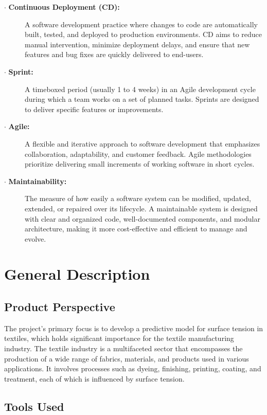 \documentclass{report}
\begin{document}
\begin{description}
    \item[$\cdot$ \textbf{Continuous Deployment (CD):}] A software development practice where changes to code are automatically built, tested, and deployed to production environments. CD aims to reduce manual intervention, minimize deployment delays, and ensure that new features and bug fixes are quickly delivered to end-users.

    \item[$\cdot$ \textbf{Sprint:}] A timeboxed period (usually 1 to 4 weeks) in an Agile development cycle during which a team works on a set of planned tasks. Sprints are designed to deliver specific features or improvements.

    \item[$\cdot$ \textbf{Agile:}] A flexible and iterative approach to software development that emphasizes collaboration, adaptability, and customer feedback. Agile methodologies prioritize delivering small increments of working software in short cycles.

    \item[$\cdot$ \textbf{Maintainability:}] The measure of how easily a software system can be modified, updated, extended, or repaired over its lifecycle. A maintainable system is designed with clear and organized code, well-documented components, and modular architecture, making it more cost-effective and efficient to manage and evolve.

\end{description}



\chapter{General Description}
\section{Product Perspective}
The project's primary focus is to develop a predictive model for surface tension in textiles, which holds significant importance for the textile manufacturing industry. The textile industry is a multifaceted sector that encompasses the production of a wide range of fabrics, materials, and products used in various applications. It involves processes such as dyeing, finishing, printing, coating, and treatment, each of which is influenced by surface tension.
\section{Tools Used}
\end{document}
